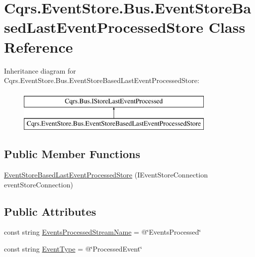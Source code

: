 \hypertarget{classCqrs_1_1EventStore_1_1Bus_1_1EventStoreBasedLastEventProcessedStore}{}\section{Cqrs.\+Event\+Store.\+Bus.\+Event\+Store\+Based\+Last\+Event\+Processed\+Store Class Reference}
\label{classCqrs_1_1EventStore_1_1Bus_1_1EventStoreBasedLastEventProcessedStore}
Inheritance diagram for Cqrs.\+Event\+Store.\+Bus.\+Event\+Store\+Based\+Last\+Event\+Processed\+Store\+:\begin{figure}[H]
\begin{center}
\leavevmode
\includegraphics[height=2.000000cm]{classCqrs_1_1EventStore_1_1Bus_1_1EventStoreBasedLastEventProcessedStore}
\end{center}
\end{figure}
\subsection*{Public Member Functions}
\begin{DoxyCompactItemize}
\item 
\hyperlink{classCqrs_1_1EventStore_1_1Bus_1_1EventStoreBasedLastEventProcessedStore_a54dc3860c38026fd298bd204e3079490}{Event\+Store\+Based\+Last\+Event\+Processed\+Store} (I\+Event\+Store\+Connection event\+Store\+Connection)
\end{DoxyCompactItemize}
\subsection*{Public Attributes}
\begin{DoxyCompactItemize}
\item 
const string \hyperlink{classCqrs_1_1EventStore_1_1Bus_1_1EventStoreBasedLastEventProcessedStore_aa3125d75a64df58026e0fd785f99bfff}{Events\+Processed\+Stream\+Name} = @\char`\"{}Events\+Processed\char`\"{}
\item 
const string \hyperlink{classCqrs_1_1EventStore_1_1Bus_1_1EventStoreBasedLastEventProcessedStore_a63b4ae4f14e782d605aff1bd214db3f1}{Event\+Type} = @\char`\"{}Processed\+Event\char`\"{}
\end{DoxyCompactItemize}
